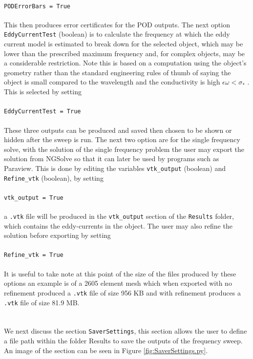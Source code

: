 \\
\texttt{PODErrorBars = True}\\
\\
This then produces error certificates for the POD outputs. The next option \texttt{EddyCurrentTest} (boolean) is to calculate the frequency at which the eddy current model is estimated to break down for the selected object, which may be lower than the prescribed maximum frequency and, for complex objects, may be a considerable restriction. Note this is based on a computation using the object's geometry rather than the standard engineering rules of thumb of saying the object is small compared to the wavelength and the conductivity is high  $\epsilon \omega < \sigma_*$ \cite{schmidt2008estimating}. This is selected by setting\\
\\
\texttt{EddyCurrentTest = True}\\
\\
These three outputs can be produced and saved then chosen to be shown or hidden after the sweep is run. The next two option are for the single frequency solve, with the solution of the single frequency problem the user may export the solution from NGSolve so that it can later be used by programs such as Paraview. This is done by editing the variables \texttt{vtk\_output} (boolean) and \texttt{Refine\_vtk} (boolean), by setting\\
\\
\texttt{vtk\_output = True}\\
\\
a \texttt{.vtk} file will be produced in the \texttt{vtk\_output} section of the \texttt{Results} folder, which contains the eddy-currents in the object. The user may also refine the solution before exporting by setting\\
\\
\texttt{Refine\_vtk = True}\\
\\
It is useful to take note at this point of the size of the files produced by these options an example is of a 2605 element mesh which when exported with no refinement produced a \texttt{.vtk} file of size 956 KB and with refinement produces a \texttt{.vtk} file of size 81.9 MB.\\
\\
\\
\noindent
We next discuss the section \texttt{SaverSettings}, this section allows the user to define a file path within the folder Results to save the outputs of the frequency sweep. An image of the section can be seen in Figure \ref{fig:SaverSettings.py}.
